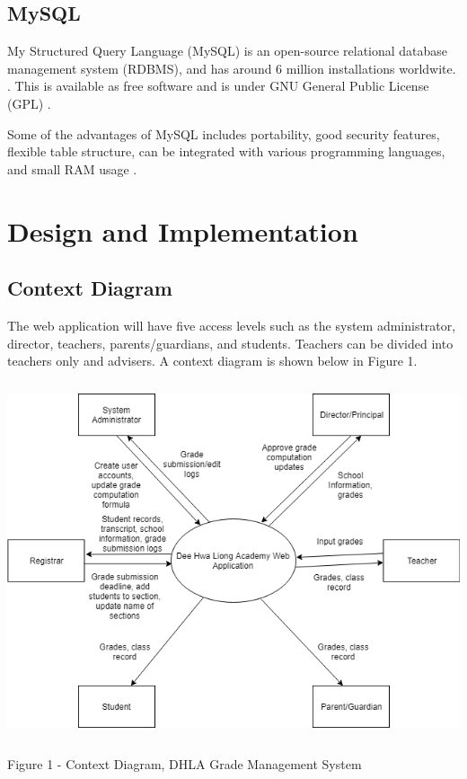 \documentclass[11pt,a4paper,titlepage]{article}
\let\stdsection\section
\renewcommand\section{\newpage\stdsection}
\begin{document}
\subsection{MySQL}

My Structured Query Language (MySQL) is an open-source relational database management system (RDBMS), and has around 6 million installations worldwite. \cite{DBEngines}. This is available as free software and is under GNU General Public License (GPL) \cite{mySQL}.

Some of the advantages of MySQL includes portability, good security features, flexible table structure, can be integrated with various programming languages, and small RAM usage \cite{mySQL}.  

\section{Design and Implementation}

\subsection{Context Diagram}

The web application will have five access levels such as the system administrator, director, teachers, parents/guardians, and students. Teachers can be divided into teachers only and advisers. A context diagram is shown below in Figure 1.

\vspace{2cm}
\begin{center}
\includegraphics[height=10.5cm]{Context-Diagram.png}
\end{center}
\vspace{2cm}
\begin{center}
    Figure 1 - Context Diagram, DHLA Grade Management System
\end{center}
\end{document}
